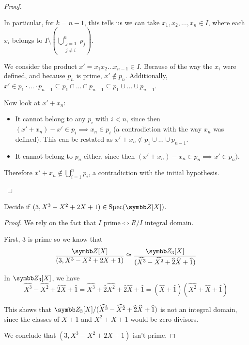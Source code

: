 \begin{proof}
\begin{itemize}
    In particular, for \(k = n - 1\), this tells us we can take \(x_1, x_2, \dots, x_n \in I\), where each \(x_i\) belongs to \(I \setminus \left(\bigcup_{\substack{j = 1 \\ j \neq i}}^{n} p_j\right)\).
    
    We consider the product \(x' = x_1 x_2 \dots x_{n-1} \in I\). Because of the way the \(x_i\) were defined, and because \(p_n\) is prime, \(x' \not\in p_n\). Additionally, \(x' \in p_1 \cdot \dots \cdot p_{n-1} \subseteq p_1 \cap \dots \cap p_{n-1} \subseteq p_1 \cup \dots \cup p_{n-1}\).
    
    Now look at \(x' + x_n\):
    \begin{itemize}
        \item It cannot belong to any \(p_i\) with \(i < n\), since then \((x' + x_n) - x' \in p_i \implies x_n \in p_i\) (a contradiction with the way \(x_n\) was defined). This can be restated as \(x' + x_n \not\in p_1 \cup \dots \cup p_{n - 1}\).
        \item It cannot belong to \(p_n\) either, since then \((x' + x_n) - x_n \in p_n \implies x' \in p_n)\).
    \end{itemize} Therefore \(x' + x_n \not\in \bigcup_{i = 1}^{n} p_i\), a contradiction with the initial hypothesis.
\end{itemize}
\end{proof}

\begin{problem}
Decide if \((3, X^3 - X^2 + 2X + 1) \in \Spec(\integers[X])\).
\end{problem}
\begin{proof}
We rely on the fact that \(I \text{ prime} \iff R/I \text{ integral domain}\).

First, \(3\) is prime so we know that
\[
\frac{\integers[X]}{(3, X^3 - X^2 + 2X + 1)} \cong \frac{\integers_3[X]}{(\widehat{X^3} - \widehat{X^2} + \widehat{2}\widehat{X} + \widehat{1})}
\]

In \(\integers_3[X]\), we have
\[
    \widehat{X^3} - \widehat{X^2} + \widehat{2}\widehat{X} + \widehat{1} = \widehat{X^3} + \widehat{2}\widehat{X^2} + \widehat{2}\widehat{X} + \widehat{1} = (\widehat{X} + \widehat{1})(\widehat{X^2} + \widehat{X} + \widehat{1})
\]

This shows that \(\integers_3[X] / (\widehat{X^3} - \widehat{X^2} + \widehat{2}\widehat{X} + \widehat{1})\) is not an integral domain, since the classes of \(X + 1\) and \(X^2 + X + 1\) would be zero divisors. 

We conclude that \((3, X^3 - X^2 + 2X + 1)\) isn't prime.
\end{proof}

